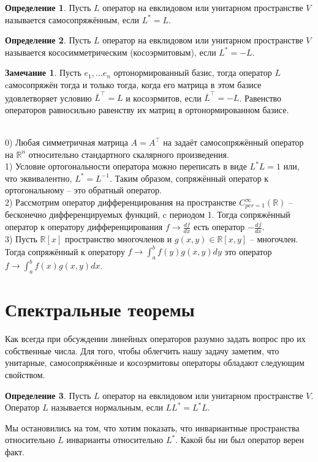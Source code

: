 \documentclass[10pt,a4paper,oneside]{book} %
\theoremstyle{definition}
\newtheorem*{rem}{Замечание}
\newtheorem*{defn}{Определение}
\newcommand{\mb}[1]{\mathbb{#1}}
\newcommand{\ovl}{\overline}
\def\exm{\noindent {\bf Примеры:}}
\def\dfn{\begin{defn}}
\def\edfn{\end{defn}}
\def\rm{\begin{rem}}
\def\erm{\end{rem}}
\begin{document}
\dfn Пусть $L$ оператор на евклидовом или унитарном пространстве $V$ называется самосопряжённым, если $L^*=L$.
\edfn

\dfn Пусть $L$ оператор на евклидовом или унитарном пространстве $V$ называется кососимметрическим (косоэрмитовым), если $L^*=-L$.
\edfn

\rm Пусть $e_1,\dots e_n$ ортонормированный базис, тогда оператор $L$ cамосопряжён тогда и только тогда, когда его матрица в этом базисе удовлетворяет условию $\ovl{L}^{\top}=L$ и косоэрмитов, если $\ovl{L}^{\top}=-L$.
\proof Равенство операторов равносильно равенству их матриц в ортонормированном базисе.
\endproof
\erm



\exm\\
0) Любая симметричная матрица $A=A^{\top}$ на  задаёт самосопряжённый оператор на $\mb R^n$ относительно стандартного скалярного произведения.\\
1) Условие ортогональности оператора можно переписать в виде $L^*L=1$ или, что эквивалентно, $L^*=L^{-1}$. Таким образом, сопряжённый оператор к ортогональному -- это обратный оператор.\\
2) Рассмотрим оператор дифференцирования на пространстве $C^{\infty}_{per=1}(\mb R)$ -- бесконечно дифференцируемых функций, c периодом 1. Тогда сопряжённый оператор к оператору дифференцирования  $f \to \frac{df}{dx}$ есть оператор $-\frac{df}{dx}$.\\
3) Пусть $\mb R[x]$ пространство многочленов и $g(x,y) \in \mb R[x,y]$ -- многочлен. Тогда сопряжённый к оператору $f \to \int_{a}^b f(y)g(x,y)dy$ это оператор $f\to\int_{a}^b f(x)g(x,y)dx$.





\section{Спектральные теоремы}

Как всегда при обсуждении линейных операторов разумно задать вопрос про их собственные числа. Для того, чтобы облегчить нашу задачу заметим, что унитарные, самосопряжённые и косоэрмитовы операторы обладают следующим свойством.

\dfn Пусть $L$ оператор на евклидовом или унитарном пространстве $V$. Оператор $L$ называется нормальным, если $LL^*=L^*L$.
\edfn



Мы остановились на том, что хотим показать, что инвариантные пространства относительно $L$ инварианты относительно $L^*$. Какой бы ни был оператор верен факт.
\end{document}

